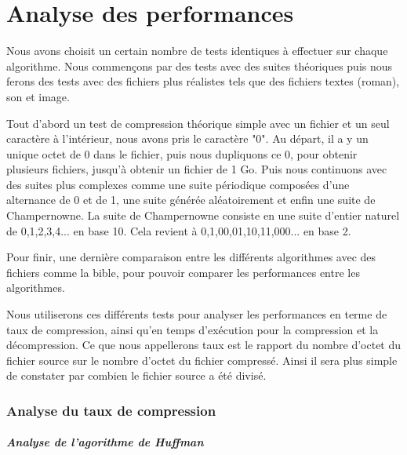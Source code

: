 \documentclass{report}
\begin{document}
\part*{Analyse des performances}
Nous avons choisit un certain nombre de tests identiques à effectuer sur chaque algorithme. Nous commençons par des tests avec des suites théoriques puis nous ferons des tests avec des fichiers plus réalistes tels que des fichiers textes (roman), son et image.
 
Tout d'abord un test de compression théorique simple avec un fichier et un seul caractère à l'intérieur, nous avons pris le caractère "0".
Au départ, il a y un unique octet de 0 dans le fichier, puis nous dupliquons ce 0, pour obtenir plusieurs fichiers, jusqu'à obtenir un fichier de 1 Go.
Puis nous continuons avec des suites plus complexes comme une suite périodique composées d'une alternance de 0 et de 1, une suite générée aléatoirement et enfin une suite de Champernowne.
La suite de Champernowne consiste en une suite d'entier naturel de 0,1,2,3,4... en base 10. Cela revient à 0,1,00,01,10,11,000... en base 2.   

Pour finir, une dernière comparaison entre les différents algorithmes avec des fichiers comme la bible, pour pouvoir comparer les performances entre les algorithmes.

Nous utiliserons ces différents tests pour analyser les performances en terme de taux de compression, ainsi qu'en temps d'exécution pour la compression et la décompression. 
Ce que nous appellerons taux est le rapport du nombre d'octet du fichier source sur le nombre d'octet du fichier compressé. Ainsi il sera plus simple de constater par combien le fichier source a été divisé. 

\section*{Analyse du taux de compression}
\subsubsection{ Analyse de l'agorithme de Huffman}
\end{document}
